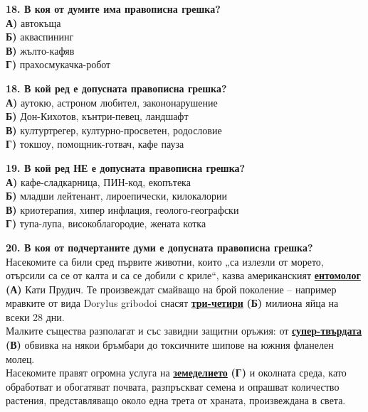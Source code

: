 \documentclass[12pt,a4paper]{article}
\begin{document}
\vspace{0.7cm}

\noindent
\textbf{18. В коя от думите има правописна грешка?} \\
\noindent
\textbf{А)} автокъща \\
\textbf{Б)} акваспининг \\
\textbf{В)} жълто-кафяв \\
\textbf{Г)} прахосмукачка-робот

\vspace{0.6cm}

\noindent
\textbf{18. В кой ред е допусната правописна грешка?} \\
\noindent
\textbf{А)} аутокю, астроном любител, закононарушение \\
\textbf{Б)} Дон-Кихотов, кънтри-певец, ландшафт \\
\textbf{В)} културтрегер, културно-просветен, родословие \\
\textbf{Г)} токшоу, помощник-готвач, кафе пауза

\vspace{0.6cm}

\noindent
\textbf{19. В кой ред НЕ е допусната правописна грешка?} \\
\noindent
\textbf{А)} кафе-сладкарница, ПИН-код, екопътека \\
\textbf{Б)} младши лейтенант, лироепически, килокалории \\
\textbf{В)} криотерапия, хипер инфлация, геолого-географски \\
\textbf{Г)} тупа-лупа, високоблагородие, жената котка

\vspace{0.6cm}

\noindent
\textbf{20. В коя от подчертаните думи е допусната правописна грешка?} \\
\noindent
Насекомите са били сред първите животни, които „са излезли от морето, отърсили са се от калта и са се добили с криле“, казва американският \underline{\textbf{ентомолог}} \textbf{(А)} Кати Прудич. Те произвеждат смайващо на брой поколение -- например мравките от вида Dorylus gribodoi снасят \underline{\textbf{три-четири}} \textbf{(Б)} милиона яйца на всеки 28 дни. \\
Малките същества разполагат и със завидни защитни оръжия: от \underline{\textbf{супер-твърдата}} \textbf{(В)} обвивка на някои бръмбари до токсичните шипове на южния фланелен молец. \\
Насекомите правят огромна услуга на \underline{\textbf{земеделието}} \textbf{(Г)} и околната среда, като обработват и обогатяват почвата, разпръскват семена и опрашват количество растения, представляващо около една трета от храната, произвеждана в света.
\end{document}
